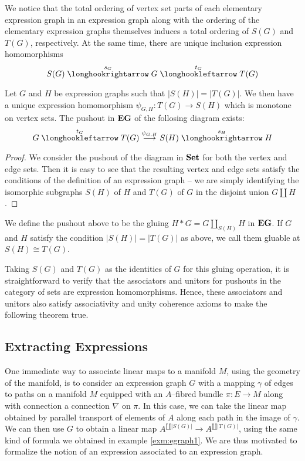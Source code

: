 \documentclass[./Thick_TQFTs_and_Quantum_Information.tex]{subfiles}
\begin{document}
\begin{rmk}
We notice that the total ordering of vertex set parts of each elementary
expression graph in an expression graph along with the ordering of the elementary
expression graphs themselves induces a total ordering of $S(G)$ and $T(G)$,
respectively. At the same time, there are unique inclusion expression
homomorphisms
\[
  S(G) \hto[s_G] G \hot[t_G] T(G)
\]
\end{rmk}

\begin{lem}
Let $G$ and $H$ be expression graphs such that $|S(H)| = |T(G)|$.
We then have a unique expression homomorphism $\psi_{G, H} : T(G) \to S(H)$ which
is monotone on vertex sets. The pushout in $\textbf{EG}$ of the follosing diagram
exists:
\[
  G \hot[t_G] T(G) \to[\psi_{G, H}] S(H) \hto[s_H] H
\]
\end{lem}
\begin{proof}
We consider the pushout of the diagram in $\textbf{Set}$ for both the vertex and edge
sets. Then it is easy to see that the resulting vertex and edge sets satisfy the
conditions of the definition of an expression graph -- we are simply identifying
the isomorphic subgraphs $S(H)$ of $H$ and $T(G)$ of $G$ in the disjoint union
$G \amalg H$.
\end{proof}

\begin{defn}
We define the pushout above to be the gluing $H * G = G \amalg_{S(H)} H$ in
$\textbf{EG}$. If $G$ and $H$ satisfy the condition $|S(H)| = |T(G)|$ as above, we call
them gluable at $S(H) \cong T(G)$.
\end{defn}

Taking $S(G)$ and $T(G)$ as the identities of $G$ for this gluing operation, it
is straightforward to verify that the associators and unitors for pushouts in
the category of sets are expression homomorphisms. Hence, these associators and
unitors also satisfy associativity and unity coherence axioms to make the
following theorem true. 

\subsection{Extracting Expressions}

One immediate way to associate linear maps to a manifold $M$, using the geometry
of the manifold, is to consider an expression graph $G$ with a mapping $\gamma$
of edges to paths on a manifold $M$ equipped with an $A$--fibred bundle
$\pi : E \to M$ along with connection a connection $\nabla$ on $\pi$. In this
case, we can take the linear map obtained by parallel transport of elements of
$A$ along each path in the image of $\gamma$. We can then use $G$ to obtain a
linear map $A^{\amalg |S(G)|} \to A^{\amalg |T(G)|}$, using the same kind of
formula we obtained in example \ref{exm:egraph1}. We are thus motivated to
formalize the notion of an expression associated to an expression graph.
\end{document}
